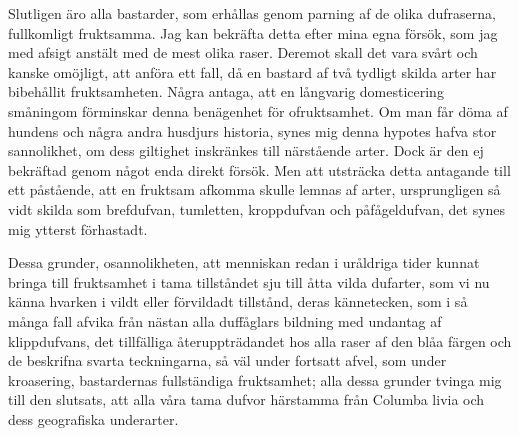 Slutligen äro alla bastarder, som erhållas genom parning af de olika dufraserna, fullkomligt fruktsamma. Jag kan bekräfta detta efter mina egna försök, som jag med afsigt anstält med de mest olika raser. Deremot skall det vara svårt och kanske omöjligt, att anföra ett fall, då en bastard af två tydligt skilda arter har bibehållit fruktsamheten. Några antaga, att en långvarig domesticering småningom förminskar denna benägenhet för ofruktsamhet. Om man får döma af hundens och några andra husdjurs historia, synes mig denna hypotes hafva stor sannolikhet, om dess giltighet inskränkes till närstående arter. Dock är den ej bekräftad genom något enda direkt försök. Men att utsträcka detta antagande till ett påstående, att en fruktsam afkomma skulle lemnas af arter, ursprungligen så vidt skilda som brefdufvan, tumletten, kroppdufvan och påfågeldufvan, det synes mig ytterst förhastadt.

Dessa grunder, osannolikheten, att menniskan redan i uråldriga tider kunnat bringa till fruktsamhet i tama tillståndet sju till åtta vilda dufarter, som vi nu känna hvarken i vildt eller förvildadt tillstånd, deras kännetecken, som i så många fall afvika från nästan alla duffåglars bildning med undantag af klippdufvans, det tillfälliga återuppträdandet hos alla raser af den blåa färgen och de beskrifna svarta teckningarna, så väl under fortsatt afvel, som under kroasering, bastardernas fullständiga fruktsamhet; alla dessa grunder tvinga mig till den slutsats, att alla våra tama dufvor härstamma från Columba livia och dess geografiska underarter.

